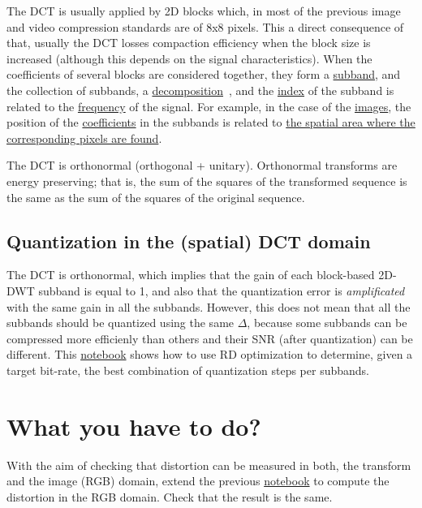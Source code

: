 The DCT is usually applied by 2D blocks which, in most of the previous
image and video compression standards are of 8x8 pixels. This a direct
consequence of that, usually the DCT losses compaction efficiency when
the block size is increased (although this depends on the signal
characteristics). When the coefficients of several blocks are
considered together, they form a
\href{https://en.wikipedia.org/wiki/Sub-band_coding}{subband}, and the
collection of subbands, a
\href{https://en.wikipedia.org/wiki/Discrete_wavelet_transform}{decomposition}~\cite{vetterli2014foundations},
and the
\href{https://en.wikipedia.org/wiki/Array_data_structure#Element_identifier_and_addressing_formulas}{index}
of the subband is related to the
\href{https://en.wikipedia.org/wiki/Frequency}{frequency} of the
signal. For example, in the case of the
\href{https://en.wikipedia.org/wiki/Digital_image}{images}, the
position of the
\href{https://en.wikipedia.org/wiki/Coefficient}{coefficients} in the
subbands is related to
\href{https://github.com/Sistemas-Multimedia/Sistemas-Multimedia.github.io/blob/master/milestones/07-DCT/block_DCT_compression.ipynb}{the
  spatial area where the corresponding pixels are found}.

The DCT is orthonormal (orthogonal + unitary). Orthonormal transforms
are energy preserving; that is, the sum of the squares of the
transformed sequence is the same as the sum of the squares of the
original sequence.

\subsection{Quantization in the (spatial) DCT domain}

The DCT is orthonormal, which implies that the gain of each
block-based 2D-DWT subband is equal to 1, and also that the
quantization error is \emph{amplificated} with the same gain in all
the subbands. However, this does not mean that all the subbands should
be quantized using the same $\Delta$, because some subbands can be
compressed more efficienly than others and their SNR (after
quantization) can be
different. This \href{https://github.com/Sistemas-Multimedia/Sistemas-Multimedia.github.io/blob/master/milestones/07-DCT/block_DCT_compression.ipynb}{notebook}
shows how to use RD optimization to determine, given a target
bit-rate, the best combination of quantization steps per subbands.

\section{What you have to do?}
With the aim of checking that distortion can be measured in both, the
transform and the image (RGB) domain, extend the
previous \href{https://github.com/Sistemas-Multimedia/Sistemas-Multimedia.github.io/blob/master/milestones/07-DCT/block_DCT_compression.ipynb}{notebook}
to compute the distortion in the RGB domain. Check that the result is
the same.

